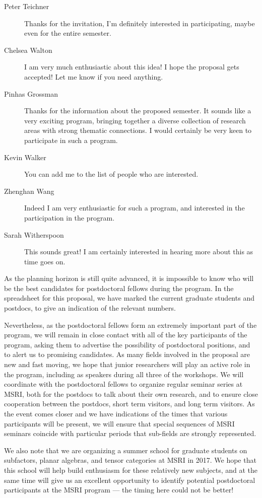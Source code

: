 \documentclass[12pt]{article}
\begin{document}
\begin{description}
\item[Peter Teichner] Thanks for the invitation, I'm definitely interested in participating, maybe even for the entire semester.
\item[Chelsea Walton] I am very much enthusiastic about this idea! I hope the proposal gets accepted! Let me know if you need anything.
\item[Pinhas Grossman] Thanks for the information about the proposed semester. It sounds like a very exciting program, bringing together a diverse collection of research areas with strong thematic connections. I would certainly be very keen to participate in such a program.
\item[Kevin Walker] You can add me to the list of people who are interested.
\item[Zhenghan Wang] Indeed I am very enthusiastic for such a program, and interested in the participation in the program.
\item[Sarah Witherspoon] This sounds great! I am certainly interested in hearing more about this as time goes on.
\end{description}

As the planning horizon is still quite advanced, it is impossible to know who will be the best candidates for postdoctoral fellows during the program. In the spreadsheet for this proposal, we have marked the current graduate students and postdocs, to give an indication of the relevant numbers.

Nevertheless, as the postdoctoral fellows form an extremely important part of the program, we will remain in close contact with all of the key participants of the program, asking them to advertise the possibility of postdoctoral positions, and to alert us to promising candidates. As many fields involved in the proposal are new and fast moving, we hope that junior researchers will play an active role in the program, including as speakers during all three of the workshops. We will coordinate with the postdoctoral fellows to organize regular seminar series at MSRI, both for the postdocs to talk about their own research, and to ensure close cooperation between the postdocs, short term visitors, and long term visitors. As the event comes closer and we have indications of the times that various participants will be present, we will ensure that special sequences of MSRI seminars coincide with particular periods that sub-fields are strongly represented.

We also note that we are organizing a summer school for graduate students on subfactors, planar algebras, and tensor categories at MSRI in 2017. We hope that this school will help build enthusiasm for these relatively new subjects, and at the same time will give us an excellent opportunity to identify potential postdoctoral participants at the MSRI program --- the timing here could not be better!
\end{document}
